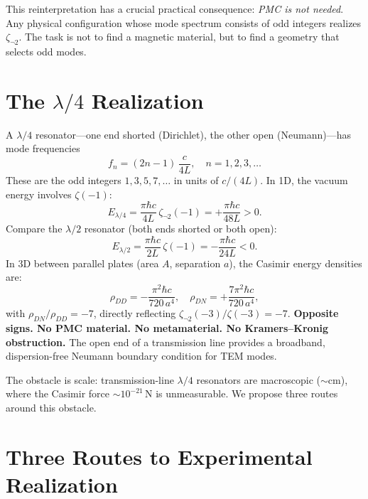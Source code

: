 \documentclass[aps,prd,twocolumn,superscriptaddress,nofootinbib]{revtex4-2}
\begin{document}
This reinterpretation has a crucial practical consequence:
\emph{PMC is not needed}.  Any physical configuration whose
mode spectrum consists of odd integers realizes $\zeta_{\neg 2}$.
The task is not to find a magnetic material, but to find a
geometry that selects odd modes.

\section{The $\lambda/4$ Realization}

A $\lambda/4$ resonator---one end shorted (Dirichlet), the other
open (Neumann)---has mode frequencies
\begin{equation}
  f_n=(2n{-}1)\,\frac{c}{4L},\quad n=1,2,3,\ldots
\end{equation}
These are the odd integers $1,3,5,7,\ldots$ in units of $c/(4L)$.
In 1D, the vacuum energy involves $\zeta(-1)$:
\begin{equation}
  E_{\lambda/4}=\frac{\pi\hbar c}{4L}\,\zeta_{\neg 2}(-1)
  =+\frac{\pi\hbar c}{48L}>0.
\end{equation}
Compare the $\lambda/2$ resonator (both ends shorted or both open):
\begin{equation}
  E_{\lambda/2}=\frac{\pi\hbar c}{2L}\,\zeta(-1)
  =-\frac{\pi\hbar c}{24L}<0.
\end{equation}
In 3D between parallel plates (area $A$, separation $a$), the
Casimir energy densities are:
\begin{equation}
  \rho_{DD}=-\frac{\pi^2\hbar c}{720\,a^4},\quad
  \rho_{DN}=+\frac{7\pi^2\hbar c}{720\,a^4},
\end{equation}
with $\rho_{DN}/\rho_{DD}=-7$, directly reflecting
$\zeta_{\neg 2}(-3)/\zeta(-3)=-7$.
\textbf{Opposite signs.  No PMC material.  No metamaterial.
No Kramers--Kronig obstruction.}  The open end of a transmission
line provides a broadband, dispersion-free Neumann boundary
condition for TEM modes.

The obstacle is scale: transmission-line $\lambda/4$ resonators
are macroscopic ($\sim$cm), where the Casimir force
$\sim 10^{-21}$\,N is unmeasurable.  We propose three routes
around this obstacle.

\section{Three Routes to Experimental Realization}
\end{document}
